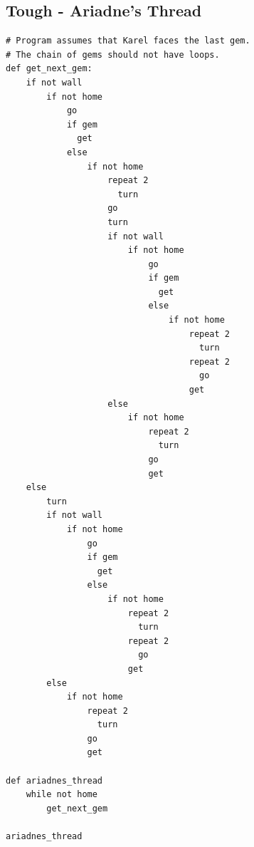 \documentclass[article,A4,12pt]{llncs}
\begin{document}
\subsection{Tough - Ariadne's Thread}
\begin{verbatim}
# Program assumes that Karel faces the last gem.
# The chain of gems should not have loops.
def get_next_gem:
    if not wall 
        if not home 
            go
            if gem 
              get
            else
                if not home
                    repeat 2 
                      turn
                    go
                    turn
                    if not wall
                        if not home
                            go
                            if gem 
                              get
                            else
                                if not home
                                    repeat 2 
                                      turn
                                    repeat 2 
                                      go
                                    get
                    else
                        if not home
                            repeat 2 
                              turn
                            go
                            get
    else 
        turn
        if not wall
            if not home
                go
                if gem 
                  get
                else
                    if not home
                        repeat 2 
                          turn
                        repeat 2 
                          go
                        get
        else
            if not home
                repeat 2 
                  turn
                go
                get

def ariadnes_thread
    while not home
        get_next_gem
        
ariadnes_thread
\end{verbatim}
\end{document}
